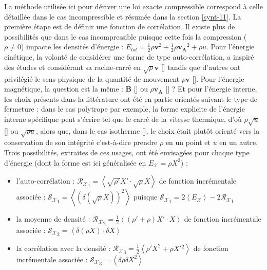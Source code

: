 La méthode utilisée ici pour dériver une loi exacte compressible correspond à celle détaillée dans le cas incompressible et résumée dans la section \ref{synt-11}. La première étape est de définir une fonction de corrélation. Il existe plus de possibilités que dans le cas incompressible puisque cette fois la compression ($\rho \neq 0$) impacte les densités d'énergie : $E_{tot} = \frac{1}{2} \rho \boldsymbol{v}^2 + \frac{1}{2} \rho \boldsymbol{v_A}^2 + \rho u $. Pour l'énergie cinétique, la volonté de considérer une forme de type auto-corrélation, a inspiré des études  et  considérant sa racine-carré en $\sqrt{\rho} \boldsymbol{v} $ [\cite{hellinger_spectral_2021}] tandis que d'autres ont privilégié le sens physique de la quantité de mouvement $\rho \boldsymbol{v}$ [\cite{galtier_exact_2011}]. Pour l'énergie magnétique, la question est la même : $\boldsymbol{B}$ [\cite{ferrand_compact_2021}] ou $\rho \boldsymbol{v_A}$ [\cite{andres_alternative_2017}] ? Et pour l'énergie interne, les choix présents dans la littérature ont été en partie orientés suivant le type de fermeture : dans le cas polytrope par exemple, la forme explicite de l'énergie interne spécifique peut s'écrire tel que le carré de la vitesse thermique, d'où $\rho \sqrt{u}$ [\cite{banerjee_kolmogorov-like_2014}] ou $\sqrt{\rho u}$, alors que, dans le cas isotherme [\cite{galtier_exact_2011}], le choix était plutôt orienté vers la conservation de son intégrité c'est-à-dire prendre $\rho$ en un point et $u$ en un autre. Trois possibilités, extraites de ces usages, ont été envisagées pour chaque type d'énergie (dont la forme est ici généralisée en $E_\mathcal{X} = \rho X^2$) : 
\begin{itemize}
    \item l'auto-corrélation : $\mathcal{R_{X}}_1 = \left<\sqrt{\rho'} X' \cdot \sqrt{\rho} X \right>$ de fonction incrémentale associée :  $\mathcal{S_{X}}_1 = \left<\left(\delta \left(\sqrt{\rho} X\right)\right)^2\right>$ puisque $\mathcal{S_{X}}_1 = 2\left<E_\mathcal{X}\right> - 2\mathcal{R_{X}}_1 $
    \item la moyenne de densité : $\mathcal{R_{X}}_2 = \frac{1}{2}\left< \left(\rho'+\rho\right) X' \cdot X \right>$ de fonction incrémentale associée :  $\mathcal{S_{X}}_2 = \left<\delta \left(\rho X\right) \cdot \delta X \right>$ 
    \item la corrélation avec la densité : $\mathcal{R_{X}}_3 = \frac{1}{2}\left< \rho' X^2 + \rho X'{}^2\right> $ de fonction incrémentale associée :  $\mathcal{S_{X}}_3 = \left<\delta \rho  \delta X^2 \right>$ 
\end{itemize}

